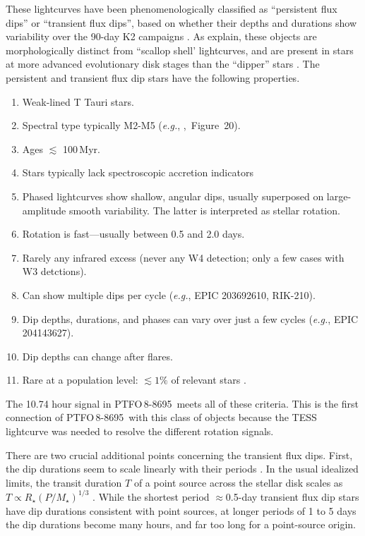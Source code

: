 \documentclass[12pt,twocolumn,tighten]{aastex62}
\newcommand{\ptfo}{PTFO$\,$8-8695}
\begin{document}
These lightcurves have been phenomenologically classified as
``persistent flux dips'' or ``transient flux dips'', based on whether
their depths and durations show variability over the 90-day K2
campaigns \citep{stauffer_orbiting_2017}.
As \citet{stauffer_orbiting_2017} explain,
these  objects are morphologically distinct from ``scallop shell' lightcurves,
and are present in stars at more advanced evolutionary disk stages than
the ``dipper'' stars \citep{ansdell_young_2016,cody_manyfaceted_2018}.
The persistent and transient flux dip stars have the following properties.
\begin{enumerate}
  \item Weak-lined T Tauri stars.
  \item Spectral type typically M2-M5 ({\it e.g.},
    \citealt{rebull_usco_2018},~Figure~20).
  \item Ages $\lesssim$ 100$\,$Myr.
  \item Stars typically lack spectroscopic accretion indicators 
  \item Phased lightcurves show shallow, angular dips, usually
    superposed on large-amplitude smooth variability. The latter
    is interpreted as stellar rotation.
  \item Rotation is fast---usually between 0.5 and 2.0 days.
  \item Rarely any infrared excess (never any W4 detection; only a few
    cases with W3 detctions).
  \item Can show multiple dips per cycle ({\it e.g.}, EPIC 203692610,
    RIK-210).
  \item Dip depths, durations, and phases can vary over just a few cycles
    ({\it e.g.}, EPIC 204143627).
  \item Dip depths can change after flares.
  \item Rare at a population level: $\lesssim 1\%$ of relevant stars
    \citep{rebull_usco_2018}.
\end{enumerate}
The 10.74 hour signal in \ptfo\ meets all of these criteria.
This is the first connection of \ptfo\ with this class of objects
because the TESS lightcurve was needed to resolve the different
rotation signals.

There are two crucial additional points concerning the transient flux
dips.  First, the dip durations seem to scale linearly with their
periods \citep[][Figure~26]{stauffer_orbiting_2017}.  In the usual
idealized limits, the transit duration $T$ of a point source across
the stellar disk scales as $T \propto R_\star (P/M_\star)^{1/3}$
\citep{winn_exoplanet_2010}.  While the shortest period
$\approx$0.5-day transient flux dip stars have dip durations
consistent with point sources, at longer periods of 1 to 5 days the
dip durations become many hours, and far too long for a point-source
origin.
\end{document}
